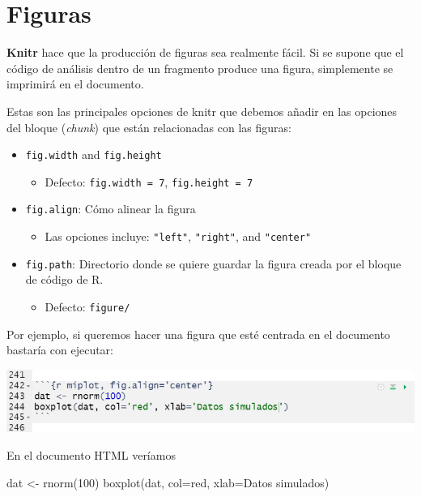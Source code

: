 \documentclass[
]{book}
\newenvironment{Shaded}{\begin{snugshade}}{\end{snugshade}}
\newcommand{\AttributeTok}[1]{\textcolor[rgb]{0.77,0.63,0.00}{#1}}
\newcommand{\DecValTok}[1]{\textcolor[rgb]{0.00,0.00,0.81}{#1}}
\newcommand{\FunctionTok}[1]{\textcolor[rgb]{0.00,0.00,0.00}{#1}}
\newcommand{\NormalTok}[1]{#1}
\newcommand{\OtherTok}[1]{\textcolor[rgb]{0.56,0.35,0.01}{#1}}
\newcommand{\StringTok}[1]{\textcolor[rgb]{0.31,0.60,0.02}{#1}}
\providecommand{\tightlist}{%
  \setlength{\itemsep}{0pt}\setlength{\parskip}{0pt}}
\begin{document}
\hypertarget{figuras}{%
\section{Figuras}\label{figuras}}

\textbf{Knitr} hace que la producción de figuras sea realmente fácil. Si se supone que el código de análisis dentro de un fragmento produce una figura, simplemente se imprimirá en el documento.

Estas son las principales opciones de knitr que debemos añadir en las opciones del bloque (\emph{chunk}) que están relacionadas con las figuras:

\begin{itemize}
\tightlist
\item
  \texttt{fig.width} and \texttt{fig.height}

  \begin{itemize}
  \tightlist
  \item
    Defecto: \texttt{fig.width\ =\ 7}, \texttt{fig.height\ =\ 7}
  \end{itemize}
\item
  \texttt{fig.align}: Cómo alinear la figura

  \begin{itemize}
  \tightlist
  \item
    Las opciones incluye: \texttt{"left"}, \texttt{"right"}, and \texttt{"center"}
  \end{itemize}
\item
  \texttt{fig.path}: Directorio donde se quiere guardar la figura creada por el bloque de código de R.

  \begin{itemize}
  \tightlist
  \item
    Defecto: \texttt{\textquotesingle{}figure/\textquotesingle{}}
  \end{itemize}
\end{itemize}

Por ejemplo, si queremos hacer una figura que esté centrada en el documento bastaría con ejecutar:

\includegraphics{figures/r_plot.png}

En el documento HTML veríamos

\begin{Shaded}
\begin{Highlighting}[]
\NormalTok{dat }\OtherTok{\textless{}{-}} \FunctionTok{rnorm}\NormalTok{(}\DecValTok{100}\NormalTok{)}
\FunctionTok{boxplot}\NormalTok{(dat, }\AttributeTok{col=}\StringTok{\textquotesingle{}red\textquotesingle{}}\NormalTok{, }\AttributeTok{xlab=}\StringTok{\textquotesingle{}Datos simulados\textquotesingle{}}\NormalTok{)}
\end{Highlighting}
\end{Shaded}
\end{document}
